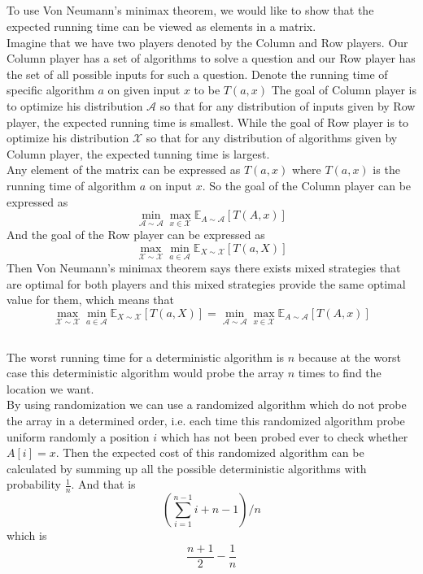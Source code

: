 \documentclass[12pt,letterpaper]{article}
\begin{document}
\subsection{}
To use Von Neumann's minimax theorem,
we would like to show that the expected running time can be viewed as 
elements in a matrix.\\
Imagine that we have two players denoted by the Column and Row players.
Our Column player has a set of algorithms to solve a question 
and our Row player has the set of all possible inputs for such a question.
Denote the running time of specific algorithm $a$ on given input $x$ to be $T(a,x)$
The goal of Column player is to optimize his distribution $\mathscr{A}$
so that for any distribution of inputs given by Row player, 
the expected running time is smallest.
While the goal of Row player is to optimize his distribution $\mathscr{X}$
so that for any distribution of algorithms given by Column player,
the expected tunning time is largest.\\
Any element of the matrix can be expressed as $T(a,x)$ 
where $T(a,x)$ is the running time of algorithm $a$ on input $x$.
So the goal of the Column player can be expressed as 
$$\min_{\mathscr{A}\sim\mathcal{A}}\max_{x\in\mathcal{X}}\mathbb{E}_{A\sim\mathscr{A}}\left[T(A,x)\right]$$
And the goal of the Row player can be expressed as 
$$\max_{\mathscr{X}\sim\mathcal{X}}\min_{a\in\mathcal{A}}\mathbb{E}_{X\sim\mathscr{X}}\left[T(a,X)\right]$$
Then Von Neumann's minimax theorem says there exists mixed strategies that are optimal for both players and 
this mixed strategies provide the same optimal value for them, 
which means that 
$$\max_{\mathscr{X}\sim\mathcal{X}}\min_{a\in\mathcal{A}}\mathbb{E}_{X\sim\mathscr{X}}\left[T(a,X)\right]=
\min_{\mathscr{A}\sim\mathcal{A}}\max_{x\in\mathcal{X}}\mathbb{E}_{A\sim\mathscr{A}}\left[T(A,x)\right]$$

\subsection{}
The worst running time for a deterministic algorithm is $n$ 
because at the worst case this deterministic algorithm would probe the 
array $n$ times to find the location we want.\\
By using randomization we can use a randomized algorithm
which do not probe the array in a determined order,
i.e. each time this randomized algorithm probe uniform randomly a 
position $i$ which has not been probed ever to check whether $A[i]=x$.
Then the expected cost of this randomized algorithm can be calculated 
by summing up all the possible deterministic algorithms with probability $\frac{1}{n}$.
And that is 
$$\left(\sum_{i=1}^{n-1}i+n-1\right)/n$$
which is $$\frac{n+1}{2}-\frac{1}{n}$$
\end{document}
